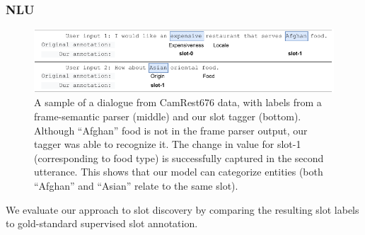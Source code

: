 \subsubsection{NLU}
\begin{figure}[h]
\includegraphics[width=1.0\textwidth]{images/label_example.pdf}
        \caption{A sample of a dialogue from CamRest676 data, with labels from a frame-semantic parser (middle) and our slot tagger (bottom).
        Although ``Afghan'' food is not in the frame parser output, our tagger was able to recognize it. The change in value for slot-1 (corresponding to food type) is successfully captured in the second utterance. This shows that our model can categorize entities (both ``Afghan'' and ``Asian'' relate to the same slot).}
    \label{fig:example}
\end{figure}
We evaluate our approach to slot discovery by comparing the resulting slot labels to gold-standard supervised slot annotation.
